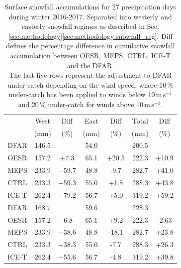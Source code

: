 \documentclass{ametsocV5}
\begin{document}
\begin{table}[t]
	\caption{
		Surface snowfall accumulations for 27 precipitation days during winter 2016-2017. Separated into westerly and easterly snowfall regimes as described in Sec. \ref{sec:methodology}\ref{sec:methodology:snowfall_reg}. Diff defines the percentage difference in cumulative snowfall accumulation between OESR, MEPS, CTRL, ICE-T and the DFAR.\\
		The last five rows represent the adjustment to DFAR under-catch depending on the wind speed, where 10\,\% under-catch has been applied to winds below 10\,m\,s$^{-1}$ and 20\,\% under-catch for winds above 10\,m\,s$^{-1}$.
	}
	\label{tab:sfc_acc}
	\begin{center}
		\begin{tabular}{c||c|c|c|c|c|c}\hline\hline
			& West & Diff & East & Diff & Total & Diff  \\
			& (mm) & (\%) & (mm) & (\%) & (mm)  & (\%)   \\\hline\hline
			DFAR & 146.5 & & 54.0 & & 200.5 & \\\hline
			OESR & 157.2 & +7.3 & 65.1 & +20.5 & 222.3 & +10.9  \\\hline
			MEPS & 233.9 & +59.7 & 48.8 & -9.7 & 282.7 & +41.0  \\\hline
			CTRL & 233.3 & +59.3 & 55.0 & +1.8 & 288.3 & +43.8  \\\hline
			ICE-T & 262.4 & +79.2 & 56.7 & +5.0 & 319.2 & +59.2  \\\hline\hline
			DFAR & 168.7 & & 59.6 & & 228.3 & \\\hline
			OESR & 157.2 & -6.8 & 65.1 & +9.2 & 222.3 & -2.63  \\\hline
			MEPS & 233.9 & +38.6 & 48.8 & -18.1 & 282.7 & +23.8  \\\hline
			CTRL & 233.3 & +38.3 & 55.0 & -7.7 & 288.3 & +26.3  \\\hline
			ICE-T & 262.4 & +55.6 & 56.7 & -4.8 & 319.2 & +39.8  \\\hline 
			
		\end{tabular}
	\end{center}
\end{table}




\end{document}
